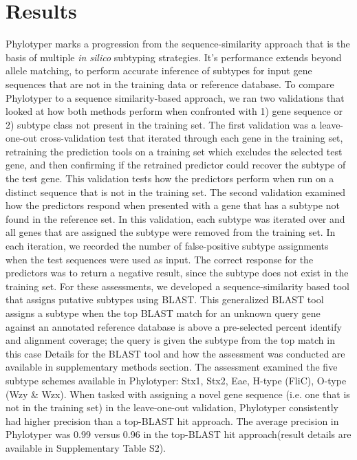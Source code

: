 \documentclass{bioinfo}
\begin{document}
\section{Results}

Phylotyper marks a progression from the sequence-similarity approach that is the basis of multiple \textit{in silico} subtyping strategies.
It's performance extends beyond allele matching, to perform accurate inference of subtypes for input gene sequences that are not in the training data or reference database.
To compare Phylotyper to a sequence similarity-based approach, we ran two validations that looked at how both methods perform when confronted with 1) gene sequence or 2) subtype class not present in the training set.
The first validation was a leave-one-out cross-validation test that iterated through each gene in the training set, retraining the prediction tools on a training set which excludes the selected test gene, and then confirming if the retrained predictor could recover the subtype of the test gene.
This validation tests how the predictors perform when run on a distinct sequence that is not in the training set.
The second validation examined how the predictors respond when presented with a gene that has a subtype not found in the reference set.
In this validation, each subtype was iterated over and all genes that are assigned the subtype were removed from the training set.
In each iteration, we recorded the number of false-positive subtype assignments when the test sequences were used as input.
The correct response for the predictors was to return a negative result, since the subtype does not exist in the training set.
For these assessments, we developed a sequence-similarity based tool that assigns putative subtypes using BLAST.
This generalized BLAST tool assigns a subtype when the top BLAST match for an unknown query gene against an annotated reference database is above a pre-selected percent identify and alignment coverage; the query is given the subtype from the top match in this case
Details for the BLAST tool and how the assessment was conducted are available in supplementary methods section.
The assessment examined the five subtype schemes available in Phylotyper: Stx1, Stx2, Eae, H-type (FliC), O-type (Wzy \& Wzx).
When tasked with assigning a novel gene sequence (i.e. one that is not in the training set) in the leave-one-out validation, Phylotyper consistently had higher precision than a top-BLAST hit approach.
The average precision in Phylotyper was 0.99 versus 0.96 in the top-BLAST hit approach(result details are available in Supplementary Table S2).
\end{document}
